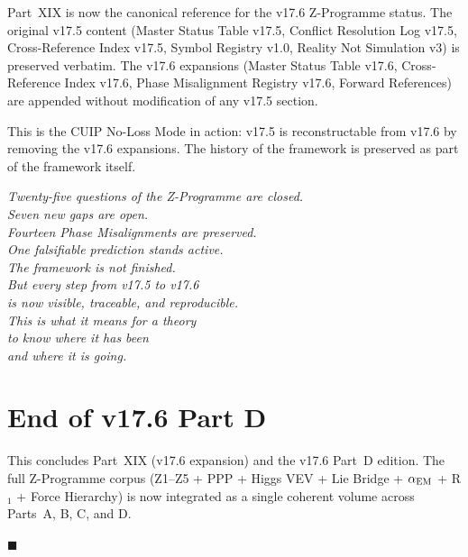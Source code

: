 \documentclass[12pt, a4paper]{article}
\begin{document}
Part~XIX is now the canonical reference for the v17.6 Z-Programme
status. The original v17.5 content (Master Status Table v17.5,
Conflict Resolution Log v17.5, Cross-Reference Index v17.5,
Symbol Registry v1.0, Reality Not Simulation v3) is preserved
verbatim. The v17.6 expansions (Master Status Table v17.6,
Cross-Reference Index v17.6, Phase Misalignment Registry v17.6,
Forward References) are appended without modification of any
v17.5 section.

This is the CUIP No-Loss Mode in action: v17.5 is reconstructable
from v17.6 by removing the v17.6 expansions. The history of
the framework is preserved as part of the framework itself.

\begin{center}
\textit{Twenty-five questions of the Z-Programme are closed.\\
Seven new gaps are open.\\
Fourteen Phase Misalignments are preserved.\\
One falsifiable prediction stands active.\\[0.4em]
The framework is not finished.\\
But every step from v17.5 to v17.6\\
is now visible, traceable, and reproducible.\\[0.4em]
This is what it means for a theory\\
to know where it has been\\
and where it is going.}
\end{center}

\bigskip
%

\section*{End of v17.6 Part D}

This concludes Part~XIX (v17.6 expansion) and the v17.6 Part~D edition.
The full Z-Programme corpus (Z1--Z5 + PPP + Higgs VEV + Lie Bridge +
$\alpha_{\rm EM}$ + R$_1$ + Force Hierarchy) is now integrated as a
single coherent volume across Parts~A, B, C, and D.

\noindent\hfill$\blacksquare$
\end{document}
